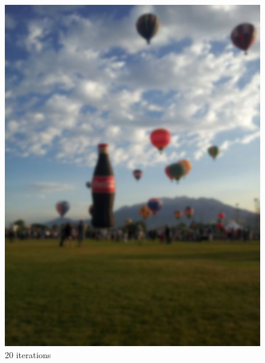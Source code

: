 \begin{figure}[ht]
\begin{minipage}[b]{0.45\linewidth}
\includegraphics[width=\textwidth]{baloon_resized_color_20.jpg}
\caption*{20 iterations}
\end{minipage}
\hspace{0.5cm}
\begin{minipage}[b]{0.45\linewidth}
\centering

\end{minipage}
\end{figure}
